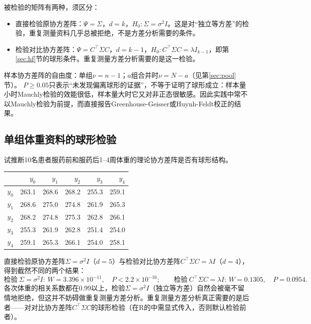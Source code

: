 被检验的矩阵有两种，须区分：
\begin{itemize}
\item 直接检验原协方差阵：$\Psi=\Sigma$，$d=k$，$H_0:\Sigma=\sigma^2I$。这是对“独立等方差”的检验，重复测量资料几乎总被拒绝，不是方差分析需要的条件。
\item 检验对比协方差阵：$\Psi=C^\top\Sigma C$，$d=k-1$，$H_0:C^\top\Sigma C=\lambda I_{k-1}$，即第\ref{sec:hf}节的球形条件。重复测量方差分析需要的是这一检验。
\end{itemize}
样本协方差阵的自由度：单组$\nu=n-1$；$a$组合并时$\nu=N-a$（见第\ref{sec:pool}节）。
$P\ge0.05$只表示“未发现偏离球形的证据”，不等于证明了球形成立：样本量小时Mauchly检验的效能很低，样本量大时它又对非正态很敏感。因此实践中常不以Mauchly检验为前提，而直接报告Greenhouse-Geisser或Huynh-Feldt校正的结果。
\subsection{单组体重资料的球形检验}
试推断10名患者服药前和服药后1--4周体重的理论协方差阵是否有球形结构。
\par\noindent\begin{minipage}{\linewidth}
\begin{center}\small\begin{tabular}{crrrrr}
\toprule &$y_0$&$y_1$&$y_2$&$y_3$&$y_4$\\\midrule
$y_0$&263.1&268.6&268.2&255.3&259.1\\
$y_1$&268.6&275.0&274.8&261.9&265.3\\
$y_2$&268.2&274.8&275.3&262.8&266.1\\
$y_3$&255.3&261.9&262.8&251.4&254.0\\
$y_4$&259.1&265.3&266.1&254.0&258.1\\\bottomrule
\end{tabular}\end{center}
\end{minipage}\par\medskip

直接检验原协方差阵$\Sigma=\sigma^2I$（$d=5$）与检验对比协方差阵$C^\top\Sigma C=\lambda I$（$d=4$），得到截然不同的两个结果：
\[
\text{检验}\ \Sigma=\sigma^2I:\ W=3.396\times10^{-11},\quad P<2.2\times10^{-16};\qquad
\text{检验}\ C^\top\Sigma C=\lambda I:\ W=0.1305,\quad P=0.0954.
\]
各次体重的相关系数都在0.99以上，检验$\Sigma=\sigma^2I$（独立等方差）自然会被毫不留情地拒绝，但这并不妨碍做重复测量方差分析。重复测量方差分析真正需要的是后者——对对比协方差阵$C^\top\Sigma C$的球形检验（在R的中需显式传入，否则默认检验前者）。
